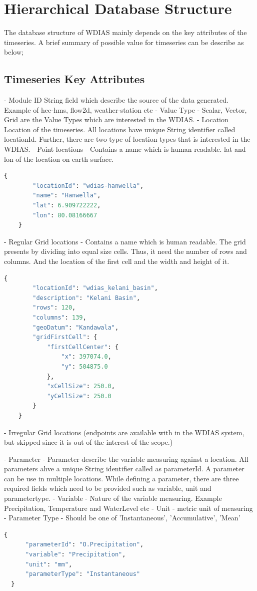 \section{Hierarchical Database Structure}
 
The database structure of WDIAS mainly depends on the key attributes of the timeseries. A brief summary of possible value for timeseries can be describe as below;

\subsection{Timeseries Key Attributes}
\label{sub:timeseries_key_attributes}
- Module ID
  String field which describe the source of the data generated. Example of hec-hms, flow2d, weather-station etc
- Value Type
  - Scalar, Vector, Grid are the Value Types which are interested in the WDIAS.
- Location
  Location of the timeseries. All locations have unique String identifier called locationId. Further, there are two type of location types that is interested in the WDIAS.
  - Point locations - Contains a name which is human readable. lat and lon of the location on earth surface.
  \begin{lstlisting}[language=Python]
    {
        "locationId": "wdias-hanwella",
        "name": "Hanwella",
        "lat": 6.909722222,
        "lon": 80.08166667
    }
  \end{lstlisting}
  - Regular Grid locations - Contains a name which is human readable. The grid presents by dividing into equal size cells. Thus, it need the number of rows and columns. 
  And the location of the first cell and the width and height of it.
  \begin{lstlisting}[language=Python]
      {
        "locationId": "wdias_kelani_basin",
        "description": "Kelani Basin",
        "rows": 120,
        "columns": 139,
        "geoDatum": "Kandawala",
        "gridFirstCell": {
            "firstCellCenter": {
                "x": 397074.0,
                "y": 504875.0
            },
            "xCellSize": 250.0,
            "yCellSize": 250.0
        }
    }
\end{lstlisting}
  - Irregular Grid locations (endpoints are available with in the WDIAS system, but skipped since it is out of the interest of the scope.)

- Parameter - Parameter describe the variable measuring against a location. All parameters ahve a unique String identifier called as parameterId. A parameter can be use in multiple locations.
While defining a parameter, there are three required fields which need to be provided such as variable, unit and parametertype.
- Variable - Nature of the variable measuring. Example Precipitation, Temperature and WaterLevel etc
- Unit - metric unit of measuring
- Parameter Type - Should be one of 'Instantaneous', 'Accumulative', 'Mean'
  \begin{lstlisting}[language=Python]
  {
      "parameterId": "O.Precipitation",
      "variable": "Precipitation",
      "unit": "mm",
      "parameterType": "Instantaneous"
  }
  \end{lstlisting}

